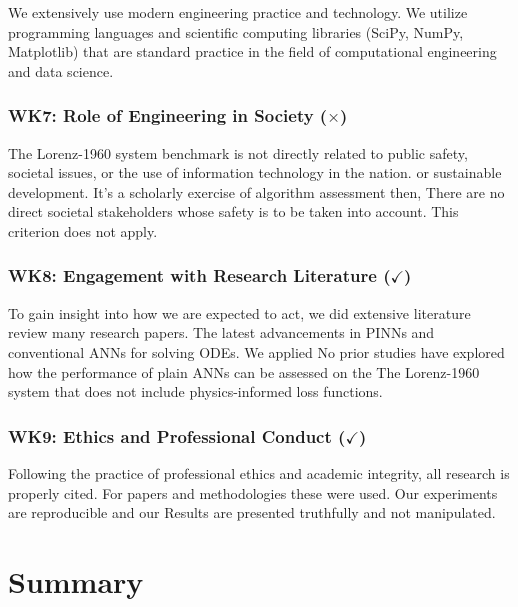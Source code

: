 We extensively use modern engineering practice and technology. We utilize programming languages and scientific computing libraries (SciPy, NumPy, Matplotlib) that are standard practice in the field of computational engineering and data science.

\subsubsection{WK7: Role of Engineering in Society ($\times$)}

The Lorenz-1960 system benchmark is not directly related to public safety, societal issues, or the use of information technology in the nation. or sustainable development. It's a scholarly exercise of algorithm assessment then, There are no direct societal stakeholders whose safety is to be taken into account. This criterion does not apply.


\subsubsection{WK8: Engagement with Research Literature ($\checkmark$)}

To gain insight into how we are expected to act, we did extensive literature review many research papers. The latest advancements in PINNs and conventional ANNs for solving ODEs. We applied No prior studies have explored how the performance of plain ANNs can be assessed on the The Lorenz-1960 system that does not include physics-informed loss functions.

\subsubsection{WK9: Ethics and Professional Conduct ($\checkmark$)}

Following the practice of professional ethics and academic integrity, all research is properly cited. For papers and methodologies these were used. Our experiments are reproducible and our Results are presented truthfully and not manipulated.



\section{Summary}